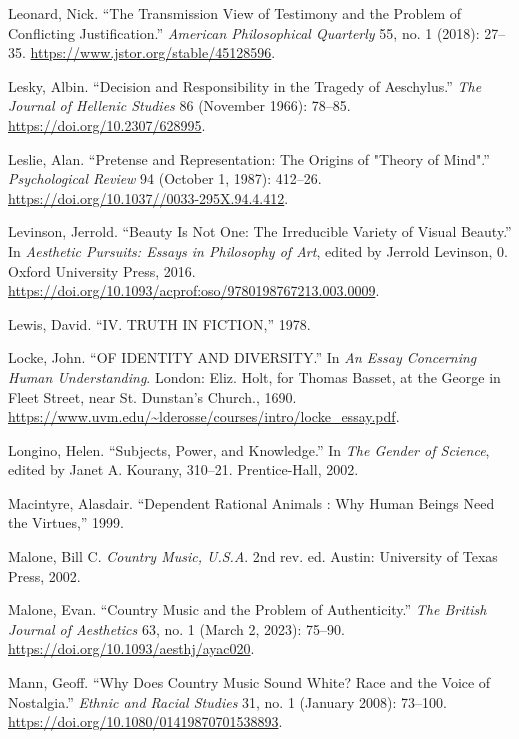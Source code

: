 \documentclass[
  12pt,
]{book}
\newlength{\cslhangindent}
\newenvironment{CSLReferences}[2] %
 {\begin{list}{}{%
  \setlength{\itemindent}{0pt}
  \setlength{\leftmargin}{0pt}
  \setlength{\parsep}{0pt}
  \ifodd #1
   \setlength{\leftmargin}{\cslhangindent}
   \setlength{\itemindent}{-1\cslhangindent}
  \fi
  \setlength{\itemsep}{#2\baselineskip}}}
 {\end{list}}
\theoremstyle{definition}
\theoremstyle{definition}
\theoremstyle{definition}
\theoremstyle{definition}
\theoremstyle{remark}
\begin{document}
\begin{CSLReferences}{1}{0}
Leonard, Nick. {``The {Transmission View} of {Testimony} and the {Problem} of {Conflicting Justification}.''} \emph{American Philosophical Quarterly} 55, no. 1 (2018): 27--35. \url{https://www.jstor.org/stable/45128596}.

Lesky, Albin. {``Decision and {Responsibility} in the {Tragedy} of {Aeschylus}.''} \emph{The Journal of Hellenic Studies} 86 (November 1966): 78--85. \url{https://doi.org/10.2307/628995}.

Leslie, Alan. {``Pretense and {Representation}: {The Origins} of "{Theory} of {Mind}".''} \emph{Psychological Review} 94 (October 1, 1987): 412--26. \url{https://doi.org/10.1037//0033-295X.94.4.412}.

Levinson, Jerrold. {``Beauty Is {Not One}: {The Irreducible Variety} of {Visual Beauty}.''} In \emph{Aesthetic {Pursuits}: {Essays} in {Philosophy} of {Art}}, edited by Jerrold Levinson, 0. Oxford University Press, 2016. \url{https://doi.org/10.1093/acprof:oso/9780198767213.003.0009}.

Lewis, David. {``{IV}. {TRUTH IN FICTION},''} 1978.

Locke, John. {``{OF IDENTITY AND DIVERSITY}.''} In \emph{An {Essay Concerning Human Understanding}}. London: Eliz. Holt, for Thomas Basset, at the George in Fleet Street, near St. Dunstan's Church., 1690. \url{https://www.uvm.edu/~lderosse/courses/intro/locke_essay.pdf}.

Longino, Helen. {``Subjects, {Power}, and {Knowledge}.''} In \emph{The {Gender} of {Science}}, edited by Janet A. Kourany, 310--21. Prentice-Hall, 2002.

Macintyre, Alasdair. {``Dependent Rational Animals : Why Human Beings Need the Virtues,''} 1999.

Malone, Bill C. \emph{Country Music, {U}.{S}.{A}}. 2nd rev. ed. Austin: University of Texas Press, 2002.

Malone, Evan. {``Country {Music} and the {Problem} of {Authenticity}.''} \emph{The British Journal of Aesthetics} 63, no. 1 (March 2, 2023): 75--90. \url{https://doi.org/10.1093/aesthj/ayac020}.

Mann, Geoff. {``Why Does Country Music Sound White? {Race} and the Voice of Nostalgia.''} \emph{Ethnic and Racial Studies} 31, no. 1 (January 2008): 73--100. \url{https://doi.org/10.1080/01419870701538893}.


\end{CSLReferences}
\end{document}

